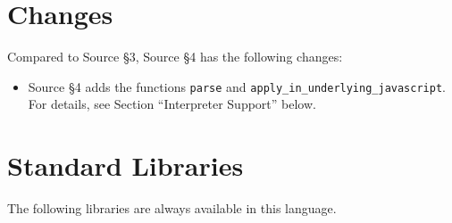 





\section{Changes}

Compared to Source \S 3, Source \S 4 has the following changes:
\begin{itemize}
\item Source \S 4 adds the functions \lstinline{parse} and
\lstinline{apply_in_underlying_javascript}. 
For details, see 
Section ``Interpreter Support'' below.
\end{itemize}





\newpage





















\section{Standard Libraries}

The following libraries are always available in this language.

















\newpage



\newpage



    
